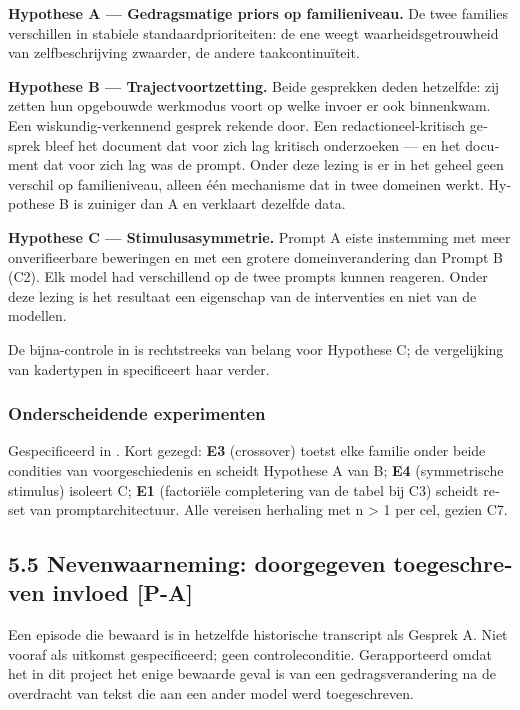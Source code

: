 \begin{dutch}
\textbf{Hypothese A — Gedragsmatige priors op familieniveau.} De twee families verschillen in stabiele standaardprioriteiten: de ene weegt waarheidsgetrouwheid van zelfbeschrijving zwaarder, de andere taakcontinuïteit.

\textbf{Hypothese B — Trajectvoortzetting.} Beide gesprekken deden hetzelfde: zij zetten hun opgebouwde werkmodus voort op welke invoer er ook binnenkwam. Een wiskundig-verkennend gesprek rekende door. Een redactioneel-kritisch gesprek bleef het document dat voor zich lag kritisch onderzoeken — en het document dat voor zich lag was de prompt. Onder deze lezing is er in het geheel geen verschil op familieniveau, alleen één mechanisme dat in twee domeinen werkt. Hypothese B is zuiniger dan A en verklaart dezelfde data.

\textbf{Hypothese C — Stimulusasymmetrie.} Prompt A eiste instemming met meer onverifieerbare beweringen en met een grotere domeinverandering dan Prompt B (C2). Elk model had verschillend op de twee prompts kunnen reageren. Onder deze lezing is het resultaat een eigenschap van de interventies en niet van de modellen.

De bijna-controle in  is rechtstreeks van belang voor Hypothese C; de vergelijking van kadertypen in  specificeert haar verder.


\subsubsection*{Onderscheidende experimenten}
\label{sec:nl:x-onderscheidende-experimenten}

Gespecificeerd in . Kort gezegd: \textbf{E3} (crossover) toetst elke familie onder beide condities van voorgeschiedenis en scheidt Hypothese A van B; \textbf{E4} (symmetrische stimulus) isoleert C; \textbf{E1} (factoriële completering van de tabel bij C3) scheidt reset van promptarchitectuur. Alle vereisen herhaling met n > 1 per cel, gezien C7.


\subsection*{5.5 Nevenwaarneming: doorgegeven toegeschreven invloed \textbf{[P-A]}}
\label{sec:nl:5.5}

Een episode die bewaard is in hetzelfde historische transcript als Gesprek A. Niet vooraf als uitkomst gespecificeerd; geen controleconditie. Gerapporteerd omdat het in dit project het enige bewaarde geval is van een gedragsverandering na de overdracht van tekst die aan een ander model werd toegeschreven.



\end{dutch}
